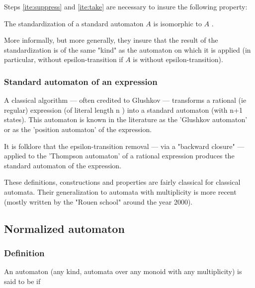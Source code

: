 \begin{remark}
  Steps \autoref{ite:suppress} and \autoref{ite:take} are necessary to
  insure the following property:

  The standardization of a standard automaton $A$ is isomorphic to $A$ .

  More informally, but more generally, they insure that the result of
  the standardization is of the same "kind" as the automaton on which
  it is applied (in particular, without epsilon-transition if $A$ is
  without epsilon-transition).
\end{remark}



\subsubsection{Standard automaton of an expression}

A classical algorithm --- often credited to Glushkov --- transforms a
rational (ie regular) expression (of literal length n ) into a
standard automaton (with n+1 states). This automaton is known in the
literature as the 'Glushkov automaton' or as the 'position automaton'
of the expression.

\begin{remark}
  It is folklore that the epsilon-transition removal --- via a
  "backward closure" --- applied to the 'Thompson automaton' of a
  rational expression produces the standard automaton of the
  expression.
\end{remark}

\begin{remark}
  These definitions, constructions and properties are fairly classical
  for classical automata. Their generalization to automata with
  multiplicity is more recent (mostly written by the "Rouen school"
  around the year 2000).
\end{remark}

\subsection{Normalized automaton}

\subsubsection{Definition}


An automaton (any kind, automata over any monoid with any
multiplicity) is said to be  if

